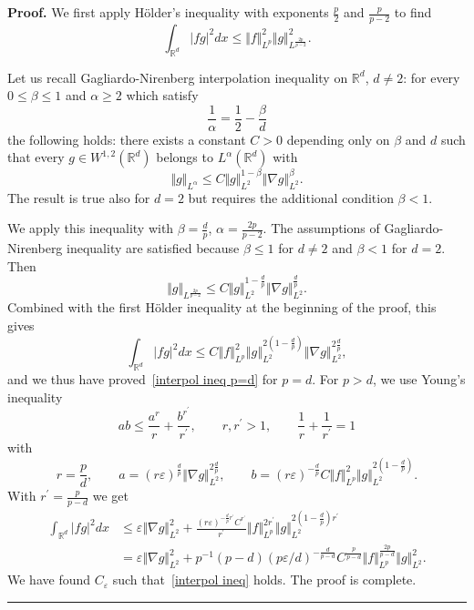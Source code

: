 \documentclass[a4paper,10pt]{article}
\newenvironment{proof}[1][Proof]{\noindent\textbf{#1.} }{\ \rule{0.5em}{0.5em}}
\begin{document}
\begin{proof}
We first apply H\"{o}lder's inequality with exponents $\frac{p}{2}$ and
$\frac{p}{p-2}$ to find
\[
\int_{\mathbb{R}^{d}} \vert fg \vert^{2}dx\leq \Vert f \Vert_{L^{p}} 
^{2} \Vert g \Vert_{L^{\frac{2p}{p-2}}}^{2}.
\]

Let us recall Gagliardo-Nirenberg interpolation inequality on $\mathbb{R}^{d} 
$, $d\neq2$: for every $0\leq\beta\leq1$ and $\alpha\geq2$ which satisfy
\[
\frac{1}{\alpha}=\frac{1}{2}-\frac{\beta}{d} 
\]
the following holds:  there exists a constant $C > 0$ depending only on $\beta$ and $d$ such that every $g \in W^{1,2}(\mathbb{R}^{d})$ belongs to $L^{\alpha}(\mathbb{R}^{d})$ with
\[
 \Vert g \Vert _{L^{\alpha}}\leq C \Vert g \Vert _{L^{2} 
}^{1-\beta} \Vert \nabla g \Vert_{L^{2}}^{\beta}.
\]
The result is true also for $d=2$ but
requires the additional condition $\beta<1$.

We apply this inequality with $\beta=\frac{d}{p}$, $\alpha=\frac{2p}{p-2}$.
The assumptions of Gagliardo-Nirenberg inequality are satisfied because
$\beta\leq1$ for $d\neq2$ and $\beta<1$ for $d=2$. Then
\[
 \Vert g \Vert _{L^{\frac{2p}{p-2}}}\leq C \Vert g \Vert
_{L^{2}}^{1-\frac{d}{p}} \Vert \nabla g \Vert_{L^{2}}^{\frac{d}{p} 
}.
\]
Combined with the first H\"older inequality at the beginning of the proof, this gives
\[
\int_{\mathbb{R}^{d}} \vert fg \vert ^{2}dx\leq C\left\Vert f\right\Vert _{L^{p}} 
^{2}\left\Vert g\right\Vert _{L^{2}}^{2(1-\frac{d}{p})
}\left\Vert \nabla g\right\Vert _{L^{2}}^{2\frac{d}{p}},
\]
and we thus have proved~\eqref{interpol ineq p=d} for $p=d$. For $p>d$, we use Young's
inequality 
\[
ab\leq\frac{a^{r}}{r}+\frac{b^{r^{\prime}}}{r^{\prime}},\qquad r,r^{\prime
}>1,\qquad\frac{1}{r}+\frac{1}{r^{\prime}}=1
\]
with
\[
r=\frac{p}{d},\qquad a=(r\varepsilon)  ^{\frac{d}{p}} \Vert
\nabla g \Vert _{L^{2}}^{2\frac{d}{p}},\qquad b=(r\varepsilon
)  ^{-\frac{d}{p}}C \Vert f \Vert _{L^{p}}^{2} \Vert
g \Vert _{L^{2}}^{2(1-\frac{d}{p})  }.
\]
With $r^{\prime}=\frac{p}{p-d}$ we get 
\begin{align*}
\int_{\mathbb{R}^{d}} \vert fg \vert ^{2}dx  &  \leq\varepsilon \Vert \nabla
g \Vert _{L^{2}}^{2}+\frac{(r\varepsilon)  ^{-\frac{d} 
{p}r^{\prime}}C^{r^{\prime}}}{r^{\prime}} \Vert f \Vert _{L^{p} 
}^{2r^{\prime}} \Vert g \Vert _{L^{2}}^{2(1-\frac{d} 
{p})  r^{\prime}}\\
&  =\varepsilon \Vert \nabla g \Vert _{L^{2}}^{2}+p^{-1}(
p-d)  (p\varepsilon/d)  ^{-\frac{d}{p-d}}C^{\frac{p}{p-d} 
} \Vert f \Vert _{L^{p}}^{\frac{2p}{p-d}} \Vert g \Vert
_{L^{2}}^{2}.
\end{align*}
We have found $C_{\varepsilon}$ such that~\eqref{interpol ineq} holds. The
proof is complete.
\end{proof}
\end{document}
